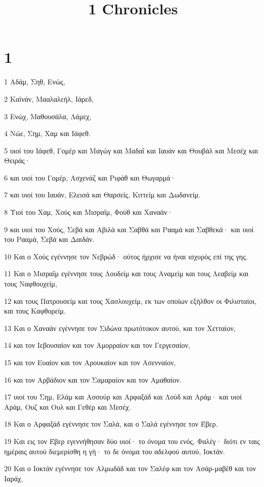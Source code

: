 

\title{1 Chronicles}


\chapter{1}

\par 1 Αδάμ, Σηθ, Ενώς,
\par 2 Καϊνάν, Μααλαλεήλ, Ιάρεδ,
\par 3 Ενώχ, Μαθουσάλα, Λάμεχ,
\par 4 Νώε, Σημ, Χαμ και Ιάφεθ.
\par 5 υιοί του Ιάφεθ, Γομέρ και Μαγώγ και Μαδαΐ και Ιαυάν και Θουβάλ και Μεσέχ και Θειράς·
\par 6 και υιοί του Γομέρ, Ασχενάζ και Ριφάθ και Θωγαρμά·
\par 7 και υιοί του Ιαυάν, Ελεισά και Θαρσείς, Κιττείμ και Δωδανείμ.
\par 8 Υιοί του Χαμ, Χούς και Μισραΐμ, Φούθ και Χαναάν·
\par 9 και υιοί του Χούς, Σεβά και Αβιλά και Σαβθά και Ρααμά και Σαβθεκά· και υιοί του Ρααμά, Σεβά και Δαιδάν.
\par 10 Και ο Χούς εγέννησε τον Νεβρώδ· ούτος ήρχισε να ήναι ισχυρός επί της γης.
\par 11 Και ο Μισραΐμ εγέννησε τους Λουδείμ και τους Αναμείμ και τους Λεαβείμ και τους Ναφθουχείμ,
\par 12 και τους Πατρουσείμ και τους Χασλουχείμ, εκ των οποίων εξήλθον οι Φιλισταίοι, και τους Καφθορείμ.
\par 13 Και ο Χαναάν εγέννησε τον Σιδώνα πρωτότοκον αυτού, και τον Χετταίον,
\par 14 και τον Ιεβουσαίον και τον Αμορραίον και τον Γεργεσαίον,
\par 15 και τον Ευαίον και τον Αρουκαίον και τον Ασενναίον,
\par 16 και τον Αρβάδιον και τον Σαμαραίον και τον Αμαθαίον.
\par 17 υιοί του Σημ, Ελάμ και Ασσούρ και Αρφαξάδ και Λούδ και Αράμ· και υιοί Αράμ, Ουζ και Ουλ και Γεθέρ και Μεσέχ.
\par 18 Και ο Αρφαξάδ εγέννησε τον Σαλά, και ο Σαλά εγέννησε τον Έβερ.
\par 19 Και εις τον Έβερ εγεννήθησαν δύο υιοί· το όνομα του ενός, Φαλέγ· διότι εν ταις ημέραις αυτού διεμερίσθη η γή· το δε όνομα του αδελφού αυτού, Ιοκτάν.
\par 20 Και ο Ιοκτάν εγέννησε τον Αλμωδάδ και τον Σαλέφ και τον Ασάρ-μαβέθ και τον Ιαράχ,
